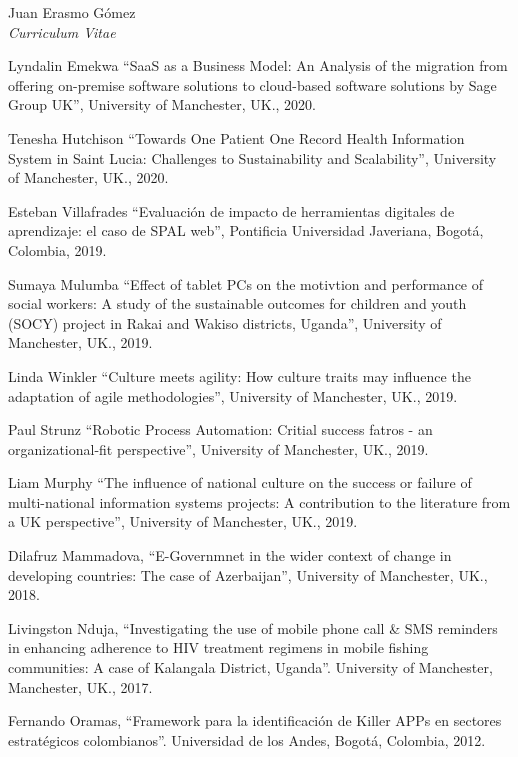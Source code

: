 \documentclass[10pt]{article}
\newenvironment{subbulletlist}{%
  \begin{list}{\labelitemii}{%
      \setlength{\topsep}{\itemsep}\setlength{\parskip}{\parsep}%
    }%
  }%
  { \end{list} }
\begin{document}
\begin{cv}{Juan Erasmo Gómez\\{\large \itshape Curriculum Vitae}}
  \begin{cvlist}{}
  \item \textbf{}
    \begin{subbulletlist}
    \item Lyndalin Emekwa ``SaaS as a Business Model: An Analysis of the migration from offering on-premise software solutions to cloud-based software solutions by Sage Group UK'', University of Manchester, UK., 2020.
    \item Tenesha Hutchison ``Towards One Patient One Record Health Information System in Saint Lucia: Challenges to Sustainability and Scalability'', University of Manchester, UK., 2020.
    \item Esteban Villafrades ``Evaluación de impacto de herramientas digitales de aprendizaje: el caso de SPAL web'', Pontificia Universidad Javeriana, Bogotá, Colombia, 2019.
    \item Sumaya Mulumba ``Effect of tablet PCs on the motivtion and performance of social workers: A study of the sustainable outcomes for children and youth (SOCY) project in Rakai and Wakiso districts, Uganda'', University of Manchester, UK., 2019.
    \item Linda Winkler ``Culture meets agility: How culture traits may influence the adaptation of agile methodologies'', University of Manchester, UK., 2019.
    \item Paul Strunz ``Robotic Process Automation: Critial success fatros - an organizational-fit perspective'', University of Manchester, UK., 2019.
    \item Liam Murphy ``The influence of national culture on the success or failure of multi-national information systems projects: A contribution to the literature from a UK perspective'', University of Manchester, UK., 2019.  
    \item Dilafruz Mammadova, ``E-Governmnet in the wider context of change in developing countries: The case of Azerbaijan'', University of Manchester, UK., 2018.
    \item Livingston Nduja, ``Investigating the use of mobile phone call \& SMS reminders in enhancing adherence to HIV treatment regimens in mobile fishing communities: A case of Kalangala District, Uganda''. University of Manchester, Manchester, UK., 2017.
    \item Fernando Oramas, ``Framework para la identificación de Killer APPs en sectores estratégicos colombianos''. Universidad de los Andes, Bogotá, Colombia, 2012.

\end{subbulletlist}
\end{cvlist}
\end{cv}
\end{document}
